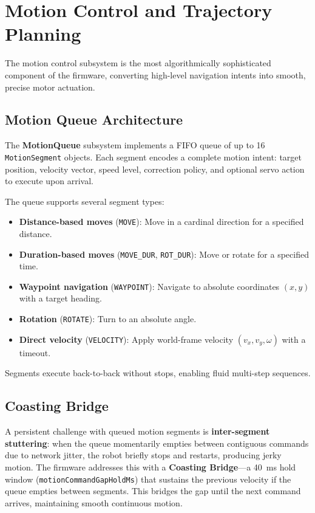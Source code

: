 \documentclass[12pt, a4paper, twoside]{article}
\begin{document}
\section{Motion Control and Trajectory Planning}
\label{sec:motion}

The motion control subsystem is the most algorithmically sophisticated component of the firmware, converting high-level navigation intents into smooth, precise motor actuation.

\subsection{Motion Queue Architecture}

The \textbf{MotionQueue} subsystem implements a FIFO queue of up to 16 \texttt{MotionSegment} objects. Each segment encodes a complete motion intent: target position, velocity vector, speed level, correction policy, and optional servo action to execute upon arrival.

The queue supports several segment types:

\begin{itemize}
    \item \textbf{Distance-based moves} (\texttt{MOVE}): Move in a cardinal direction for a specified distance.
    \item \textbf{Duration-based moves} (\texttt{MOVE\_DUR}, \texttt{ROT\_DUR}): Move or rotate for a specified time.
    \item \textbf{Waypoint navigation} (\texttt{WAYPOINT}): Navigate to absolute coordinates $(x, y)$ with a target heading.
    \item \textbf{Rotation} (\texttt{ROTATE}): Turn to an absolute angle.
    \item \textbf{Direct velocity} (\texttt{VELOCITY}): Apply world-frame velocity $(v_x, v_y, \omega)$ with a timeout.
\end{itemize}

Segments execute back-to-back without stops, enabling fluid multi-step sequences.

\subsection{Coasting Bridge}

A persistent challenge with queued motion segments is \textbf{inter-segment stuttering}: when the queue momentarily empties between contiguous commands due to network jitter, the robot briefly stops and restarts, producing jerky motion. The firmware addresses this with a \textbf{Coasting Bridge}---a \SI{40}{\milli\second} hold window (\texttt{motionCommandGapHoldMs}) that sustains the previous velocity if the queue empties between segments. This bridges the gap until the next command arrives, maintaining smooth continuous motion.
\end{document}
